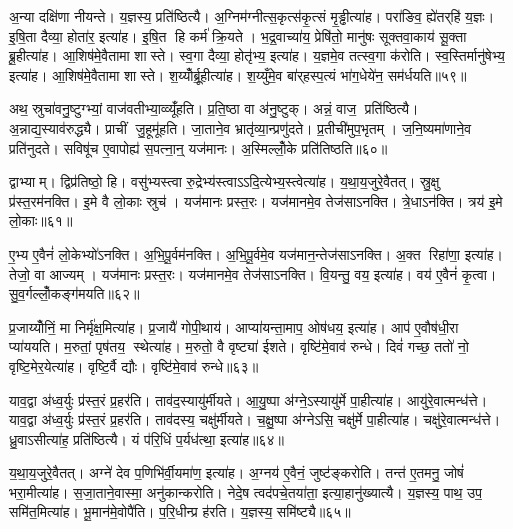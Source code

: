 अ॒न्या दक्षि॑णा नीयन्ते। य॒ज्ञस्य॒ प्रति॑ष्ठित्यै। अ॒ग्निम॑ग्नीत्स॒कृत्स॑कृ॒त्सं मृ॒ड्ढीत्या॑ह। परा॑ङिव॒ ह्ये॑तर्‌हि॑ य॒ज्ञः। इ॒षि॒ता दैव्या॒ होता॑र॒ इत्या॑ह। इ॒षि॒त हि कर्म॑ क्रि॒यते। भ॒द्र॒वाच्या॑य॒ प्रेषि॑तो॒ मानु॑षः सूक्तवा॒काय॑ सू॒क्ता ब्रू॒हीत्या॑ह। आ॒शिष॑मे॒वैतामा शास्ते। स्व॒गा दैव्या॒ होतृ॑भ्य॒ इत्या॑ह। य॒ज्ञमे॒व तत्स्व॒गा क॑रोति। स्व॒स्तिर्मानु॑षेभ्य॒ इत्या॑ह। आ॒शिष॑मे॒वैतामा शास्ते। श॒य्योँर्ब्रू॒हीत्या॑ह। श॒य्युँमे॒व बा॑र्‌हस्प॒त्यं भा॑ग॒धेये॑न॒ सम॑र्धयति॥५९॥\anuvakamend[च॒र॒त्य॒ध्व॒र्युः प्रजा॑तिर्ह्वयते॒ वेदाब्रवीद्बर्‌हि॒षद॑ङ्करोत्यृ॒त्विजो॑ दधाति ब्र॒ह्माऽनु॑करोति च॒त्वारि॑ च]

अथ॒ स्रुचा॑वनु॒ष्टुग्भ्यां॒ वाज॑वतीभ्या॒व्व्यूँ॑हति। प्र॒ति॒ष्ठा वा अ॑नु॒ष्टुक्। अन्नं॒ वाज॒ प्रति॑ष्ठित्यै। अ॒न्नाद्य॒स्याव॑रुद्ध्यै। प्राचीं जु॒हूमू॑हति। जा॒ताने॒व भ्रातृ॑व्या॒न्प्रणु॑दते। प्र॒तीची॑मुप॒भृतम्। ज॒नि॒ष्यमा॑णाने॒व प्रति॑नुदते। सविषू॑च ए॒वापोह्य॑ स॒पत्ना॒न्॒ यज॑मानः। अ॒स्मिल्लोँ॒के प्रति॑तिष्ठति॥६०॥

द्वाभ्याम्। द्विप्र॑तिष्ठो॒ हि। वसु॑भ्यस्त्वा रु॒द्रेभ्य॑स्त्वाऽऽदि॒त्येभ्य॒स्त्वेत्या॑ह। य॒था॒य॒जुरे॒वैतत्। स्रु॒क्षु प्र॑स्त॒रम॑नक्ति। इ॒मे वै लो॒काः स्रुच॑। यज॑मानः प्रस्त॒रः। यज॑मानमे॒व तेज॑साऽनक्ति। त्रे॒धाऽन॑क्ति। त्रय॑ इ॒मे लो॒काः॥६१॥

ए॒भ्य ए॒वैनं॑ लो॒केभ्यो॑ऽनक्ति। अ॒भि॒पू॒र्वम॑नक्ति। अ॒भि॒पू॒र्वमे॒व यज॑मान॒न्तेज॑साऽनक्ति। अ॒क्त रिहा॑णा॒ इत्या॑ह। तेजो॒ वा आज्यम्। यज॑मानः प्रस्त॒रः। यज॑मानमे॒व तेज॑साऽनक्ति। वि॒यन्तु॒ वय॒ इत्या॑ह। वय॑ ए॒वैनं॑ कृ॒त्वा। सु॒व॒र्गल्लोँ॒कङ्ग॑मयति॥६२॥

प्र॒जाय्योँनिं॒ मा निर्मृ॑क्ष॒मित्या॑ह। प्र॒जायै॑ गोपी॒थाय॑। आप्या॑यन्ता॒माप॒ ओष॑धय॒ इत्या॑ह। आप॑ ए॒वौष॑धी॒रा प्या॑ययति। म॒रुतां॒ पृष॑तय॒ स्थेत्या॑ह। म॒रुतो॒ वै वृष्ट्या॑ ईशते। वृष्टि॑मे॒वाव॑ रुन्धे। दिवं॑ गच्छ॒ ततो॑ नो॒ वृष्टि॒मेर॒येत्या॑ह। वृष्टि॒र्वै द्यौः। वृष्टि॑मे॒वाव॑ रुन्धे॥६३॥

याव॒द्वा अ॑ध्व॒र्युः प्र॑स्त॒रं प्र॒हर॑ति। ताव॑द॒स्यायु॑र्मीयते। आ॒यु॒ष्पा अ॑ग्ने॒ऽस्यायु॑र्मे पा॒हीत्या॑ह। आयु॑रे॒वात्मन्ध॑त्ते। याव॒द्वा अ॑ध्व॒र्युः प्र॑स्त॒रं प्र॒हर॑ति। ताव॑दस्य॒ चक्षु॑र्मीयते। च॒क्षु॒ष्पा अ॑ग्नेऽसि॒ चक्षु॑र्मे पा॒हीत्या॑ह। चक्षु॑रे॒वात्मन्ध॑त्ते। ध्रु॒वाऽसीत्या॑ह॒ प्रति॑ष्ठित्यै। यं प॑रि॒धिं प॒र्यध॑त्था॒ इत्या॑ह॥६४॥

य॒था॒य॒जुरे॒वैतत्। अग्ने॑ देव प॒णिभि॑र्वी॒यमा॑ण॒ इत्या॑ह। अ॒ग्नय॑ ए॒वैनं॒ जुष्ट॑ङ्करोति। तन्त॑ ए॒तमनु॒ जोषं॑ भरा॒मीत्या॑ह। स॒जा॒ताने॒वास्मा॒ अनु॑कान्करोति। नेदे॒ष त्वद॑पचे॒तया॑ता॒ इत्या॒हानु॑ख्यात्यै। य॒ज्ञस्य॒ पाथ॒ उप॒ समि॑त॒मित्या॑ह। भू॒मान॑मे॒वोपै॑ति। प॒रि॒धीन्प्र ह॑रति। य॒ज्ञस्य॒ समि॑ष्ट्यै॥६५॥

